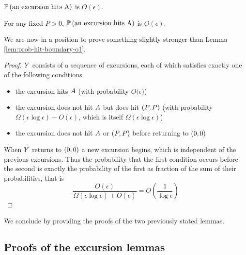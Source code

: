 {\newcommand{\Omegaeloge}{\Omega(\epsilon\log\epsilon)}

\begin{lemma}
  \label{lem:Phitboundaryline}
  $\mathbb{P}\left(\text{an excursion hits A}\right)$ is $O(\epsilon)$.
\end{lemma}

\begin{lemma}
  \label{lem:Pabsorbedandtravelsfar}
  For any fixed $P > 0$, $\mathbb{P}\left(\text{an excursion hits A}\right)$ is $O(\epsilon)$.
\end{lemma}

We are now in a position to prove something slightly stronger than
Lemma \ref{lem:prob-hit-boundary-o1}.

\begin{lemma}\label{lem:prob-hit-boundary-o1loge}
\end{lemma}

\newcommand{\Oe}{O(\epsilon)}

\begin{proof}
  $Y$ consists of a sequence of excursions, each of which satisfies
  exactly one of the following conditions
  \begin{itemize}
  \item the excursion hits $A$ (with probability
    $O(\epsilon$))
  \item the excursion does not hit $A$ but does hit
    $(P,P)$ (with probability $\Omegaeloge-\Oe$, which is itself
    $\Omegaeloge$)
  \item the excursion does not hit $A$ or $(P,P)$ before
    returning to $(0,0)$
  \end{itemize}
  When $Y$ returns to $(0,0)$ a new excursion begins, which is independent of
  the previous excursions.  Thus the probability that the first
  condition occurs before the second is exactly the probability of the
  first as fraction of the sum of their probabilities, that is
  \[
  \frac{\Oe}{\Omegaeloge + \Oe} = O\left(\frac{1}{\log\epsilon}\right)
  \]
\end{proof}

We conclude by providing the proofs of the two previously
stated lemmas.

\subsection{Proofs of the excursion lemmas}

}
